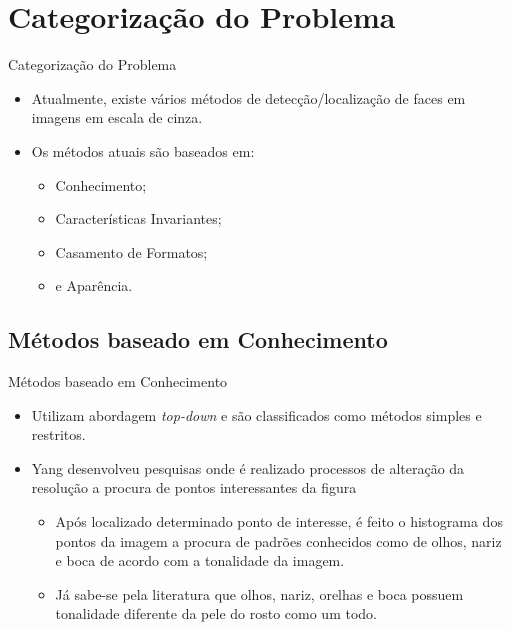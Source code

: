 \documentclass[aspectratio=169, xcolor=dvipsnames]{beamer}
\let\olditem=\item%
\renewcommand{\item}{\olditem \justifying}
\begin{document}
\section{Categorização do Problema}
\begin{frame}{Categorização do Problema}
	\begin{itemize}
		\setlength{\itemsep}{1.5em}
		\item Atualmente, existe vários métodos de detecção/localização de faces em imagens em escala de cinza. 
		
		\item Os métodos atuais são baseados em:
		
		\begin{itemize}
			\setlength{\itemsep}{0.8em}
			\item Conhecimento;
			\item Características Invariantes;
			\item Casamento de Formatos;
			\item e Aparência.
		\end{itemize}
		
	\end{itemize}
\end{frame}

\subsection{Métodos baseado em Conhecimento}
\begin{frame}{Métodos baseado em Conhecimento}
	\begin{itemize}
		\setlength{\itemsep}{1.5em}
		\item Utilizam abordagem \textit{top-down} e são classificados como métodos simples e restritos. 
		
		\item Yang \cite{yang1994human} desenvolveu pesquisas onde é realizado processos de alteração da resolução a procura de pontos interessantes da figura 
		\begin{itemize}
			\setlength{\itemsep}{1em}
			\item Após localizado determinado ponto de interesse, é feito o histograma dos pontos da imagem a procura de padrões conhecidos como de olhos, nariz e boca de acordo com a tonalidade da imagem.
			
			\item Já sabe-se pela literatura que olhos, nariz, orelhas e boca possuem tonalidade diferente da pele do rosto como um todo.
		\end{itemize}
	\end{itemize}
\end{frame}
\end{document}
